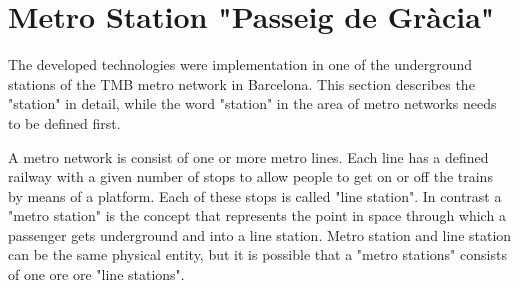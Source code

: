 
%  
%    


\section{Metro Station "Passeig de Gr\`{a}cia"}
\label{sec:station}


The developed technologies were implementation in one of the underground stations of the TMB metro network in Barcelona. This section describes the "station" in detail, while the word "station" in the area of metro networks needs to be defined first.

A metro network is consist of one or more metro lines. Each line has a defined railway with a given number of stops to allow people to get on or off the trains by means of a platform. Each of these stops is called "line station". In contrast a "metro station" is the concept that represents the point in space through which a passenger gets underground and into a line station. Metro station and line station can be the same physical entity, but it is possible that a "metro stations" consists of one ore ore "line stations".

